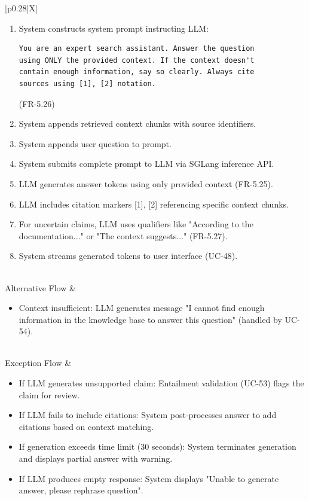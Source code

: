 \begin{minipage}{\textwidth}
\begin{tabularx}{\textwidth}{|p{0.28\textwidth}|X|}
{        \begin{enumerate}
            \item System constructs system prompt instructing LLM:
            \begin{verbatim}
You are an expert search assistant. Answer the question
using ONLY the provided context. If the context doesn't
contain enough information, say so clearly. Always cite
sources using [1], [2] notation.
            \end{verbatim}
            (FR-5.26)
            \item System appends retrieved context chunks with source identifiers.
            \item System appends user question to prompt.
            \item System submits complete prompt to LLM via SGLang inference API.
            \item LLM generates answer tokens using only provided context (FR-5.25).
            \item LLM includes citation markers [1], [2] referencing specific context chunks.
            \item For uncertain claims, LLM uses qualifiers like "According to the documentation..." or "The context suggests..." (FR-5.27).
            \item System streams generated tokens to user interface (UC-48).
        \end{enumerate}%
        } \\
    \hline
    Alternative Flow &
        \parbox[t]{\linewidth}{%
        \begin{itemize}
            \item Context insufficient: LLM generates message "I cannot find enough information in the knowledge base to answer this question" (handled by UC-54).
        \end{itemize}%
        } \\
    \hline
    Exception Flow &
        \parbox[t]{\linewidth}{%
        \begin{itemize}
            \item If LLM generates unsupported claim: Entailment validation (UC-53) flags the claim for review.
            \item If LLM fails to include citations: System post-processes answer to add citations based on context matching.
            \item If generation exceeds time limit (30 seconds): System terminates generation and displays partial answer with warning.
            \item If LLM produces empty response: System displays "Unable to generate answer, please rephrase question".
        \end{itemize}%
        } \\
    \hline
\end{tabularx}
\end{minipage}
\bigskip

\clearpage
